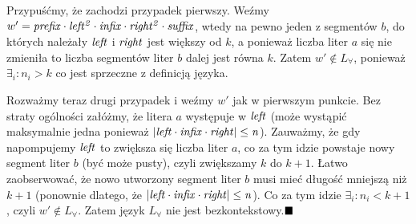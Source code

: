 \documentclass{article}
\begin{document}
Przypuśćmy, że zachodzi przypadek pierwszy. Weźmy $w'=\it prefix \cdot \it left^2 \cdot \it infix \cdot \it right^2 \cdot \it suffix$, wtedy na pewno jeden z segmentów $b$, do których należały $\it left $ i $\it right$ jest większy od $k$, a ponieważ liczba liter $a$ się nie zmieniła to liczba segmentów liter $b$ dalej jest równa $k$. Zatem $w' \not \in L_{\forall}$, ponieważ $\exists_i : n_i > k$ co jest sprzeczne z definicją języka.

Rozważmy teraz drugi przypadek i weźmy $w'$ jak w pierwszym punkcie. Bez straty ogólności załóżmy, że litera $a$ występuje w $\it left$ (może wystąpić maksymalnie jedna ponieważ $\it |left \cdot \it infix \cdot \it right| \leq n$). Zauważmy, że gdy napompujemy $\it left$ to zwiększa się liczba liter $a$, co za tym idzie powstaje nowy segment liter $b$ (być może pusty), czyli zwiększamy $k$ do $k+1$. Łatwo zaobserwować, że nowo utworzony segment liter $b$ musi mieć długość mniejszą niż $k+1$ (ponownie dlatego, że $\it |left \cdot \it infix \cdot \it right| \leq n$). Co za tym idzie $\exists_i : n_i < k+1 $, czyli $w' \not \in L_{\forall}$. Zatem język $L_{\forall}$ nie jest bezkontekstowy.$ \hfill \blacksquare$
\end{document}
